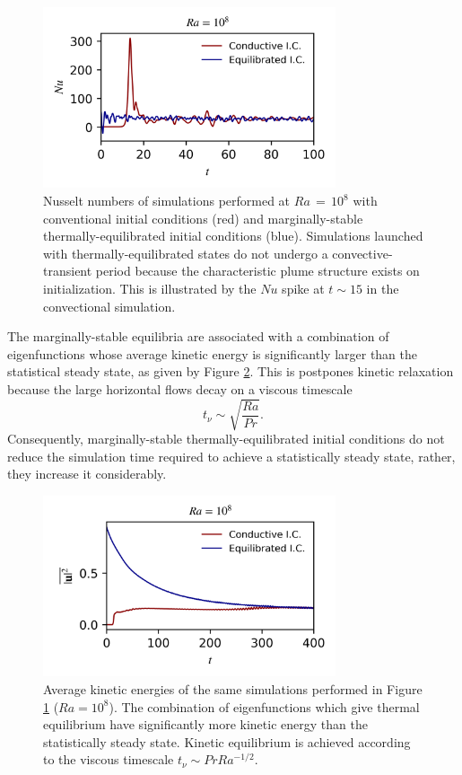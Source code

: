 \documentclass[reprint,amsmath,amssymb,aps]{revtex4-1}
\begin{document}
\begin{figure}
    \centering
    \includegraphics[width=3.4in]{sim_eq_nu.png}
    \caption{Nusselt numbers of simulations performed at $Ra \, = \, 10^8$ with conventional initial conditions (red) and marginally-stable thermally-equilibrated initial conditions (blue). Simulations launched with thermally-equilibrated states do not undergo a convective-transient period because the characteristic plume structure exists on initialization. This is illustrated by the $Nu$ spike at $t \sim 15$ in the convectional simulation.}
    \label{fig:nu_sim}
\end{figure}
\par The marginally-stable equilibria are associated with a combination of eigenfunctions whose average kinetic energy is significantly larger than the statistical steady state, as given by Figure \ref{fig:ke_sim}. This is postpones kinetic relaxation because the large horizontal flows decay on a viscous timescale
\begin{equation}
    t_{\nu} \sim \sqrt{\frac{Ra}{Pr}}. \nonumber
\end{equation}
Consequently, marginally-stable thermally-equilibrated initial conditions do not reduce the simulation time required to achieve a statistically steady state, rather, they increase it considerably.
\begin{figure}[h]
    \centering
    \includegraphics[width=3.4in]{sim_eq_ke.png}
    \caption{Average kinetic energies of the same simulations performed in Figure \ref{fig:nu_sim} ($Ra = 10^8$). The combination of eigenfunctions which give thermal equilibrium have significantly more kinetic energy than the statistically steady state. Kinetic equilibrium is achieved according to the viscous timescale $t_{\nu} \sim Pr Ra^{-1/2}$.}
    \label{fig:ke_sim}
\end{figure}
\end{document}
